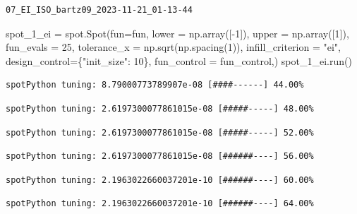 \documentclass[
  letterpaper,
  DIV=11,
  numbers=noendperiod]{scrreprt}
\newenvironment{Shaded}{\begin{snugshade}}{\end{snugshade}}
\newcommand{\DecValTok}[1]{\textcolor[rgb]{0.68,0.00,0.00}{#1}}
\newcommand{\NormalTok}[1]{\textcolor[rgb]{0.00,0.23,0.31}{#1}}
\newcommand{\OperatorTok}[1]{\textcolor[rgb]{0.37,0.37,0.37}{#1}}
\newcommand{\StringTok}[1]{\textcolor[rgb]{0.13,0.47,0.30}{#1}}
\begin{document}
\begin{verbatim}
07_EI_ISO_bartz09_2023-11-21_01-13-44
\end{verbatim}

\begin{Shaded}
\begin{Highlighting}[]
\NormalTok{spot\_1\_ei }\OperatorTok{=}\NormalTok{ spot.Spot(fun}\OperatorTok{=}\NormalTok{fun,}
\NormalTok{                   lower }\OperatorTok{=}\NormalTok{ np.array([}\OperatorTok{{-}}\DecValTok{1}\NormalTok{]),}
\NormalTok{                   upper }\OperatorTok{=}\NormalTok{ np.array([}\DecValTok{1}\NormalTok{]),}
\NormalTok{                   fun\_evals }\OperatorTok{=} \DecValTok{25}\NormalTok{,}
\NormalTok{                   tolerance\_x }\OperatorTok{=}\NormalTok{ np.sqrt(np.spacing(}\DecValTok{1}\NormalTok{)),}
\NormalTok{                   infill\_criterion }\OperatorTok{=} \StringTok{"ei"}\NormalTok{,}
\NormalTok{                   design\_control}\OperatorTok{=}\NormalTok{\{}\StringTok{"init\_size"}\NormalTok{: }\DecValTok{10}\NormalTok{\},}
\NormalTok{                   fun\_control }\OperatorTok{=}\NormalTok{ fun\_control,)}
\NormalTok{spot\_1\_ei.run()}
\end{Highlighting}
\end{Shaded}

\begin{verbatim}
spotPython tuning: 8.79000773789907e-08 [####------] 44.00% 
\end{verbatim}

\begin{verbatim}
spotPython tuning: 2.6197300077861015e-08 [#####-----] 48.00% 
\end{verbatim}

\begin{verbatim}
spotPython tuning: 2.6197300077861015e-08 [#####-----] 52.00% 
\end{verbatim}

\begin{verbatim}
spotPython tuning: 2.6197300077861015e-08 [######----] 56.00% 
\end{verbatim}

\begin{verbatim}
spotPython tuning: 2.1963022660037201e-10 [######----] 60.00% 
\end{verbatim}

\begin{verbatim}
spotPython tuning: 2.1963022660037201e-10 [######----] 64.00% 
\end{verbatim}
\end{document}
